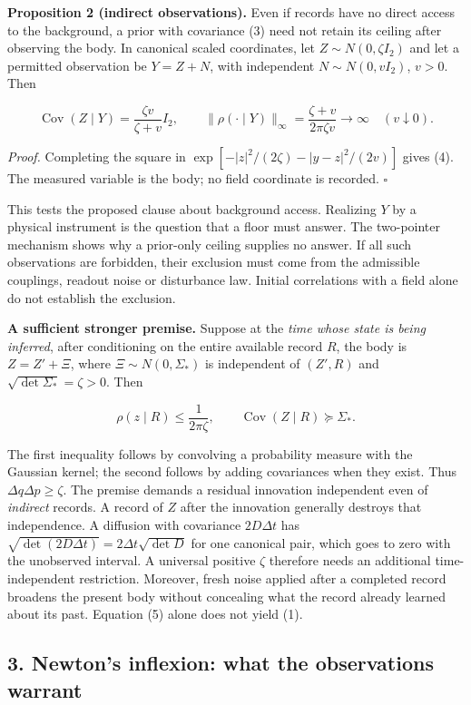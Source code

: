 \documentclass[11pt,a4paper]{article}
\begin{document}
\textbf{Proposition 2 (indirect observations).} Even if records have no
direct access to the background, a prior with covariance (3) need not
retain its ceiling after observing the body. In canonical scaled
coordinates, let \(Z\sim N(0,\zeta I_2)\) and let a permitted
observation be \(Y=Z+N\), with independent \(N\sim N(0,v I_2)\),
\(v>0\). Then

\[\operatorname{Cov}(Z\mid Y)=\frac{\zeta v}{\zeta+v}I_2,\qquad
\|\rho(\cdot\mid Y)\|_\infty=
\frac{\zeta+v}{2\pi\zeta v}\longrightarrow\infty\quad(v\downarrow0). \tag{4}\]

\emph{Proof.} Completing the square in
\(\exp[-|z|^2/(2\zeta)-|y-z|^2/(2v)]\) gives (4). The measured variable
is the body; no field coordinate is recorded. \(\square\)

This tests the proposed clause about background access. Realizing \(Y\)
by a physical instrument is the question that a floor must answer. The
two-pointer mechanism shows why a prior-only ceiling supplies no answer.
If all such observations are forbidden, their exclusion must come from
the admissible couplings, readout noise or disturbance law. Initial
correlations with a field alone do not establish the exclusion.

\textbf{A sufficient stronger premise.} Suppose at the \emph{time whose
state is being inferred}, after conditioning on the entire available
record \(R\), the body is \(Z=Z'+\Xi\), where \(\Xi\sim N(0,\Sigma_*)\)
is independent of \((Z',R)\) and \(\sqrt{\det\Sigma_*}=\zeta>0\). Then

\[\rho(z\mid R)\le\frac1{2\pi\zeta},\qquad
\operatorname{Cov}(Z\mid R)\succeq\Sigma_*. \tag{5}\]

The first inequality follows by convolving a probability measure with
the Gaussian kernel; the second follows by adding covariances when they
exist. Thus \(\Delta q\Delta p\ge\zeta\). The premise demands a residual
innovation independent even of \emph{indirect} records. A record of
\(Z\) after the innovation generally destroys that independence. A
diffusion with covariance \(2D\Delta t\) has
\(\sqrt{\det(2D\Delta t)}=2\Delta t\sqrt{\det D}\) for one canonical
pair, which goes to zero with the unobserved interval. A universal
positive \(\zeta\) therefore needs an additional time-independent
restriction. Moreover, fresh noise applied after a completed record
broadens the present body without concealing what the record already
learned about its past. Equation (5) alone does not yield (1).

\hypertarget{newtons-inflexion-what-the-observations-warrant}{%
\subsection{3. Newton's inflexion: what the observations
warrant}\label{newtons-inflexion-what-the-observations-warrant}}
\end{document}

